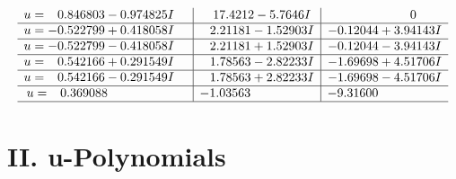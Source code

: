 \documentclass[1p]{elsarticle_modified}
\theoremstyle{definition}
\begin{document}
$$\begin{array}{c|c|c}
\begin{aligned}
u &= \phantom{-}0.846803 - 0.974825 I\end{aligned}
 & \phantom{-}17.4212 - 5.7646 I & \phantom{-0.000000 } 0 \\ \hline\begin{aligned}
u &= -0.522799 + 0.418058 I\end{aligned}
 & \phantom{-}2.21181 - 1.52903 I & -0.12044 + 3.94143 I \\ \hline\begin{aligned}
u &= -0.522799 - 0.418058 I\end{aligned}
 & \phantom{-}2.21181 + 1.52903 I & -0.12044 - 3.94143 I \\ \hline\begin{aligned}
u &= \phantom{-}0.542166 + 0.291549 I\end{aligned}
 & \phantom{-}1.78563 - 2.82233 I & -1.69698 + 4.51706 I \\ \hline\begin{aligned}
u &= \phantom{-}0.542166 - 0.291549 I\end{aligned}
 & \phantom{-}1.78563 + 2.82233 I & -1.69698 - 4.51706 I \\ \hline\begin{aligned}
u &= \phantom{-}0.369088\phantom{ +0.000000I}\end{aligned}
 & -1.03563\phantom{ +0.000000I} & -9.31600\phantom{ +0.000000I}\\
 \hline 
 \end{array}$$\newpage
\newpage\renewcommand{\arraystretch}{1}
\centering \section*{ II. u-Polynomials}
\end{document}
